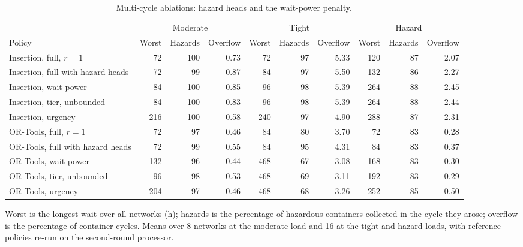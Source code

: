 \begin{table}[!htbp]
\caption{Multi-cycle ablations: hazard heads and the wait-power penalty.}
\label{tab:ablation_rollout}
\centering
\footnotesize
\setlength{\tabcolsep}{2.5pt}
\begin{tabular}{lrrrrrrrrr}
\toprule
& \multicolumn{3}{c}{Moderate} & \multicolumn{3}{c}{Tight} & \multicolumn{3}{c}{Hazard} \\
\cmidrule(lr){2-4}\cmidrule(lr){5-7}\cmidrule(lr){8-10}
Policy & Worst & Hazards & Overflow & Worst & Hazards & Overflow & Worst & Hazards & Overflow \\
\midrule
Insertion, full, $r = 1$ & 72 & 100 & 0.73 & 72 & 97 & 5.33 & 120 & 87 & 2.07 \\
Insertion, full with hazard heads & 72 & 99 & 0.87 & 84 & 97 & 5.50 & 132 & 86 & 2.27 \\
Insertion, wait power & 84 & 100 & 0.85 & 96 & 98 & 5.39 & 264 & 88 & 2.45 \\
Insertion, tier, unbounded & 84 & 100 & 0.83 & 96 & 98 & 5.39 & 264 & 88 & 2.44 \\
Insertion, urgency & 216 & 100 & 0.58 & 240 & 97 & 4.90 & 288 & 87 & 2.31 \\
\addlinespace
OR-Tools, full, $r = 1$ & 72 & 97 & 0.46 & 84 & 80 & 3.70 & 72 & 83 & 0.28 \\
OR-Tools, full with hazard heads & 72 & 99 & 0.55 & 84 & 95 & 4.31 & 84 & 83 & 0.37 \\
OR-Tools, wait power & 132 & 96 & 0.44 & 468 & 67 & 3.08 & 168 & 83 & 0.30 \\
OR-Tools, tier, unbounded & 96 & 98 & 0.53 & 468 & 69 & 3.11 & 192 & 83 & 0.29 \\
OR-Tools, urgency & 204 & 97 & 0.46 & 468 & 68 & 3.26 & 252 & 85 & 0.50 \\
\bottomrule
\end{tabular}
\par\smallskip\footnotesize Worst is the longest wait over all networks (h); hazards is the percentage of hazardous containers collected in the cycle they arose; overflow is the percentage of container-cycles. Means over 8 networks at the moderate load and 16 at the tight and hazard loads, with reference policies re-run on the second-round processor.
\end{table}
